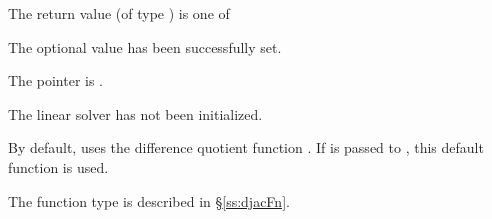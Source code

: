 {
  The return value  (of type ) is one of
  \begin{args}
  \item[\Id{CVDENSE\_SUCCESS}] 
    The optional value has been successfully set.
  \item[\Id{CVDENSE\_MEM\_NULL}]
    The  pointer is .
  \item[\Id{CVDENSE\_LMEM\_NULL}]
    The {\cvdense} linear solver has not been initialized.
  \end{args}
}
{
  By default, {\cvdense} uses the difference quotient function .
  If  is passed to , this default function is used.

  The function type  is described in \S\ref{ss:djacFn}.
}

